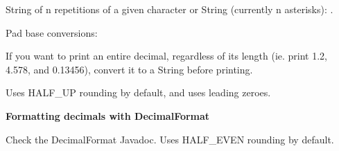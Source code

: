 String of n repetitions of a given character or String (currently n asterisks): .

Pad base conversions: 

If you want to print an entire decimal, regardless of its length (ie. print 1.2, 4.578, and 0.13456), convert it to a String before printing.

Uses HALF\_UP rounding by default, and uses leading zeroes.

\textbf{Formatting decimals with DecimalFormat}

Check the DecimalFormat Javadoc. Uses HALF\_EVEN rounding by default.

\newpage